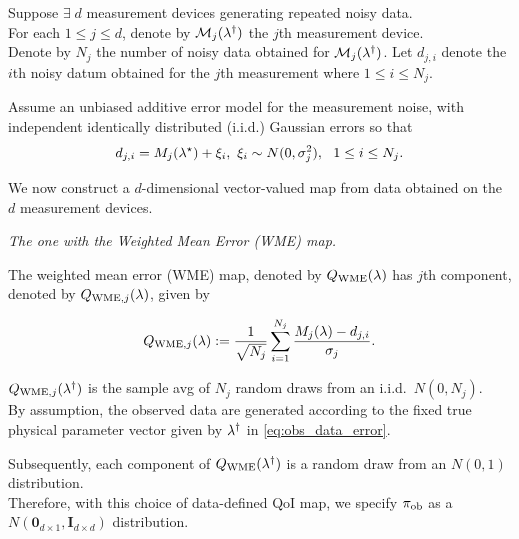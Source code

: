 \begin{frame}[t]
\centering
Suppose $\exists \; d$ measurement devices generating repeated noisy data. \\
\vskip 12pt
For each $1\leq j\leq d$, denote by $\mathcal{M}_j(\lambda^\dagger)$ the $j$th measurement device. \\

Denote by $N_j$ the number of noisy data obtained for $\mathcal{M}_j(\lambda^\dagger)$.
\vskip 12pt
Let $d_{j,i}$ denote the $i$th noisy datum obtained for the $j$th measurement where $1\leq i\leq N_j$.

\vskip 12pt
Assume an unbiased additive error model for the measurement noise,
with independent identically distributed (i.i.d.) Gaussian errors so that
\begin{equation}\label{eq:obs_data_error}
	d_{j,i} = M_j(\param^\star) + \xi_i, \ \xi_i\sim N(0,\sigma_j^2), \ \ 1\leq i\leq N_j.
\end{equation}

\vskip 12pt
We now construct a $d$-dimensional vector-valued map from data obtained on the $d$ measurement devices.

\end{frame}


\begin{frame}[t]{\it The one with the Weighted Mean Error (WME) map.}
\centering

The weighted mean error (WME) map, denoted by $Q_\text{WME}(\lambda)$ has $j$th component, denoted by $Q_{\text{WME},j}(\lambda)$, given by

\begin{equation}\label{eq:qoi_WME}
	Q_{\text{WME},j}(\lambda) := \frac{1}{\sqrt{N_j}} \sum_{i=1}^{N_j} \frac{M_j(\lambda)-d_{j,i}}{\sigma_j}.
\end{equation}

\vskip 12pt
$Q_{\text{WME},j}(\lambda^\dagger)$ is the sample avg of $N_j$ random draws from an i.i.d.~$N(0,N_j)$.\\
By assumption, the observed data are generated according to the fixed true physical parameter vector given by $\lambda^\dagger$ in \eqref{eq:obs_data_error}.

\vskip 12pt
Subsequently, each component of $Q_\text{WME}(\lambda^\dagger)$ is a random draw from an $N(0,1)$ distribution.\\
Therefore, with this choice of data-defined QoI map, we specify $\operatorname*{\pi_{ob}}$ as a $N(\mathbf{0}_{d\times 1},\mathbf{I}_{d\times d})$ distribution.

\end{frame}


